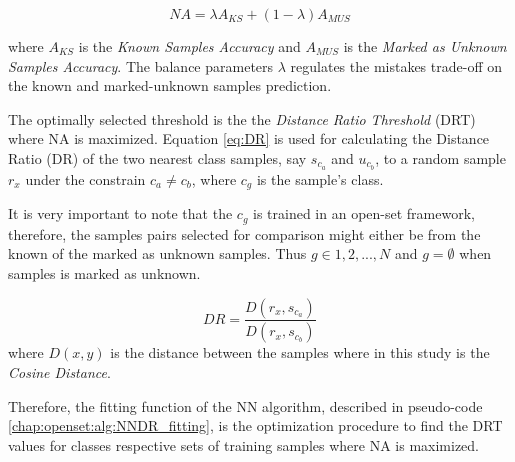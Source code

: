 \begin{equation} \label{chap:openset:sec:eq:NA}
    NA = \lambda A_{KS} + (1 - \lambda) A_{MUS}
\end{equation}

\noindent
where $A_{KS}$ is the \textit{Known Samples Accuracy} and $A_{MUS}$ is the \textit{Marked as Unknown Samples Accuracy}. The balance parameters $\lambda$ regulates the mistakes trade-off on the known and marked-unknown samples prediction.

The optimally selected threshold is the the \textit{Distance Ratio Threshold} (DRT) where NA is maximized. Equation \ref{eq:DR} is used for calculating the Distance Ratio (DR) of the two nearest class samples, say $s_{c_{a}}$ and $u_{c_{b}}$, to a random sample $r_{x}$ under the constrain $c_{a} \neq c_{b}$, where $c_{g}$ is the sample's class.

It is very important to note that the $c_{g}$ is trained in an open-set framework, therefore, the samples pairs selected for comparison might either be from the known of the marked as unknown samples. Thus $g \in {1,2,...,N}$ and $g = \emptyset$ when samples is marked as unknown.

\begin{equation} \label{eq:DR}
    DR = \frac{D(r_{x}, s_{c_{a}})}{D(r_{x}, s_{c_{b}})}
\end{equation}
\noindent
where $D(x,y)$ is the distance between the samples where in this study is the \textit{Cosine Distance}.

Therefore, the fitting function of the NN algorithm, described in pseudo-code \ref{chap:openset:alg:NNDR_fitting}, is the optimization procedure to find the DRT values for classes respective sets of training samples where NA is maximized.

\hfill

